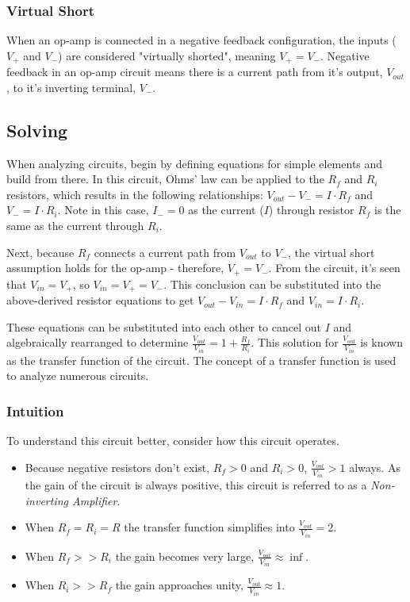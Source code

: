 \documentclass[main.tex]{subfiles}
\begin{document}
\subsubsection{Virtual Short}
\noindent When an op-amp is connected in a negative feedback configuration, the inputs ($V_{+}$ and $V_{-}$) are considered "virtually shorted", meaning $V_{+} = V_{-}$. Negative feedback in an op-amp circuit means there is a current path from it's output, $V_{out}$, to it's inverting terminal, $V_{-}$.

\subsection{Solving}
\noindent When analyzing circuits, begin by defining equations for simple elements and build from there. In this circuit,  Ohms' law can be applied to the $R_f$ and $R_i$ resistors, which results in the following relationships: $V_{out} - V_{-} = I \cdot R_f$ and $V_{-} = I \cdot R_i$. Note in this case, $I_{-} = 0$ as the current ($I$) through resistor $R_f$ is the same as the current through $R_i$. \newline

\newnoindentpara Next, because $R_f$ connects a current path from $V_{out}$ to $V_{-}$, the virtual short assumption holds for the op-amp - therefore, $V_{+} = V_{-}$. From the circuit, it's seen that $V_{in} = V_{+}$, so $V_{in} = V_{+} = V_{-}$. This conclusion can be substituted into the above-derived resistor equations to get $V_{out} - V_{in} = I \cdot R_f$ and $V_{in} = I \cdot R_i$. \newline

\newnoindentpara These equations can be substituted into each other to cancel out $I$ and algebraically rearranged to determine $\frac{V_{out}}{V_{in}} = 1 + \frac{R_f}{R_i}$. This solution for $\frac{V_{out}}{V_{in}}$ is known as the transfer function of the circuit. The concept of a transfer function is used to analyze numerous circuits. 

\subsubsection{Intuition}
To understand this circuit better, consider how this circuit operates.
\begin{itemize}
    \item Because negative resistors don't exist, $R_f > 0$ and $R_i > 0$, $\frac{V_{out}}{V_{in}} > 1$ always. As the gain of the circuit is always positive, this circuit is referred to as a \textit{Non-inverting Amplifier}. 
    \item When $R_f = R_i = R$ the transfer function simplifies into $\frac{V_{out}}{V_{in}} = 2$.
    \item When $R_f >> R_i$ the gain becomes very large, $\frac{V_{out}}{V_{in}} \approx \inf$.
    \item When $R_i >> R_f$ the gain approaches unity, $\frac{V_{out}}{V_{in}} \approx 1$.
\end{itemize}
\end{document}

